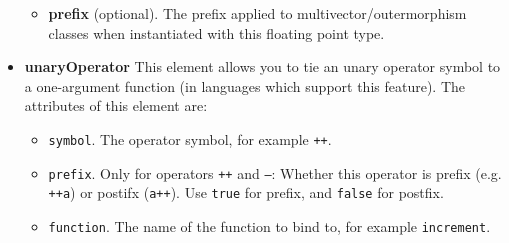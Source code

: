 \documentclass[10pt, a4paper]{article}
\begin{document}
\begin{itemize}
\begin{itemize}
            
       \item {\bf prefix} (optional). The prefix applied to multivector/outermorphism classes when instantiated with this
            floating point type.
            
       \end{itemize}
       
\item {\bf unaryOperator} This element allows you to tie an unary operator symbol to a one-argument function (in
      languages which support this feature). The attributes of this element are:
       \begin{itemize}
       \item {\tt symbol}. The operator symbol, for example {\tt ++}.
       \item {\tt prefix}. Only for operators {\tt ++} and {\tt --}:
            Whether this operator is prefix (e.g. {\tt ++a}) or postifx ({\tt a++}). Use {\tt true}
            for prefix, and {\tt false} for postfix. 
       \item {\tt function}. The name of the function to bind to, for example {\tt increment}.
       \end{itemize}
         

\end{itemize}
\end{document}
